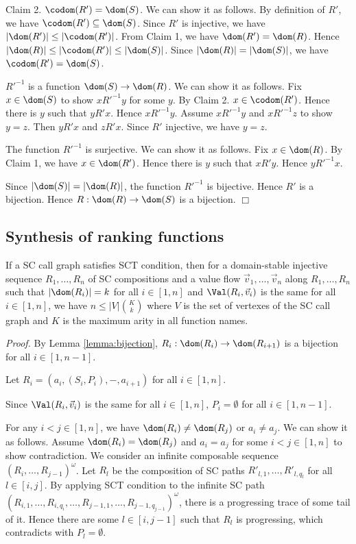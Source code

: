 Claim 2. $\codom(R')=\dom(S)$.
We can show it as follows.
By definition of $R'$, we have $\codom(R') \subseteq \dom(S)$.
Since $R'$ is injective, we have $|\dom(R')| \le |\codom(R')|$.
From Claim 1, we have $\dom(R')=\dom(R)$.
Hence $|\dom(R)| \le |\codom(R')| \le |\dom(S)|$.
Since $|\dom(R)| = |\dom(S)|$, we have $\codom(R')=\dom(S)$.

$R'^{-1}$ is a function $\dom(S) \to \dom(R)$.
We can show it as follows.
Fix $x \in \dom(S)$ to show $x R'^{-1} y$ for some $y$.
By Claim 2. $x \in \codom(R')$. Hence there is $y$ such that $y R' x$.
Hence $x R'^{-1} y$.
Assume $x R'^{-1} y$ and $x R'^{-1} z$ to show $y=z$.
Then $y R' x$ and $z R' x$.
Since $R'$ injective, we have $y=z$.

The function $R'^{-1}$ is surjective.
We can show it as follows.
Fix $x \in \dom(R)$.
By Claim 1, we have $x \in \dom(R')$.
Hence there is $y$ such that $x R' y$.
Hence $y R'^{-1} x$.

Since $|\dom(S)|=|\dom(R)|$, the function $R'^{-1}$ is bijective.
Hence $R'$ is a bijection.
Hence $R:\dom(R) \to \dom(S)$ is a bijection.
$\Box$

\subsection{Synthesis of ranking functions}

\begin{Lemma}\label{lemma:maxlen}
If a SC call graph satisfies SCT condition,
then
for a domain-stable injective sequence $R_1,\ldots, R_n$ of SC compositions
and a value flow $\Vec v_1,\ldots,\Vec v_n$ along $R_1,\ldots, R_n$
such that $|\dom(R_i)|=k$ for all $i \in [1,n]$ and
$\Val(R_i,\Vec v_i)$ is the same for all $i \in [1,n]$,
we have
$n \le |V|{K \choose k}$
where $V$ is the set of vertexes of the SC call graph and
$K$ is the maximum arity in all function names.
\end{Lemma}

{\em Proof.}
By Lemma \ref{lemma:bijection},
$R_i:\dom(R_i) \to \dom(R_{i+1})$ is a bijection for all $i \in [1,n-1]$.

Let $R_i=(a_i,(S_i,P_i),-,a_{i+1})$ for all $i \in [1,n]$.

Since $\Val(R_i,\Vec v_i)$ is the same for all $i \in [1,n]$,
$P_i = \emptyset$ for all $i \in [1,n-1]$.

For any $i <j \in [1,n]$, we have $\dom(R_i) \ne \dom(R_j)$ or $a_i \ne a_j$.
We can show it as follows.
Assume $\dom(R_i) = \dom(R_j)$ and $a_i = a_j$
for some $i < j \in [1,n]$ to show contradiction.
We consider an infinite composable sequence $(R_i,\ldots,R_{j-1})^\omega$.
Let $R_l$ be the composition of SC paths $R'_{l,1},\ldots,R'_{l,q_l}$
for all $l \in [i,j]$.
By applying SCT condition to
the infinite SC path 
$(R_{i,1},\dots,R_{i,q_i},\ldots,R_{j-1,1},\ldots,R_{j-1,q_{j-1}})^\omega$,
there is a progressing trace of some tail of it.
Hence
there are some $l \in [i,j-1]$ such that $R_l$ 
is progressing, which contradicts
with $P_l = \emptyset$.

